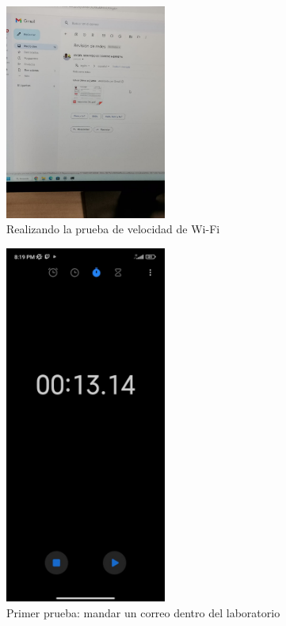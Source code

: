 \documentclass[11pt]{article}
\begin{document}
\begin{figure}[htbp]
\centering
\includegraphics[width=200px]{./prueba-correo.jpeg}
\caption{Realizando la prueba de velocidad de Wi-Fi}
\end{figure}

\begin{figure}[htbp]
\centering
\includegraphics[width=200px]{./tiempo2.jpeg}
\caption{Primer prueba: mandar un correo dentro del laboratorio}
\end{figure}
\end{document}
